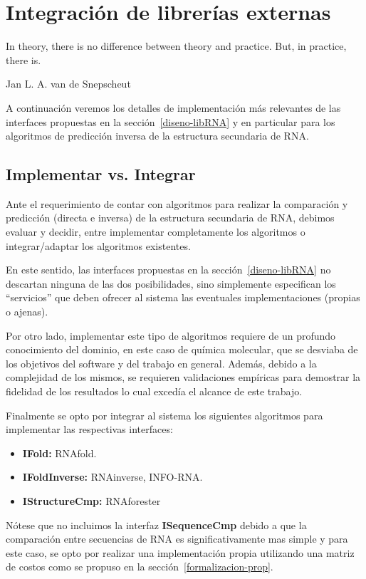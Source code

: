 \chapter{Integraci\'on de librer\'ias externas}
\label{librerias}
\epigraph{In theory, there is no difference between theory and practice. But, in
practice, there is.}%
{Jan L. A. van de Snepscheut}

A continuaci\'on veremos los detalles de implementaci\'on m\'as relevantes de
las interfaces propuestas en la secci\'on~\ref{diseno-libRNA} y en particular
para los algoritmos de predicci\'on inversa de la estructura secundaria de
\ac{RNA}.

\section{Implementar vs. Integrar}

Ante el requerimiento de contar con algoritmos para realizar la comparaci\'on y
predicci\'on (directa e inversa) de la estructura secundaria de \ac{RNA},
debimos evaluar y decidir, entre implementar completamente los algoritmos o
integrar/adaptar los algoritmos existentes.

En este sentido, las interfaces propuestas en la secci\'on~\ref{diseno-libRNA}
no descartan ninguna de las dos posibilidades, sino simplemente especifican los
``servicios'' que deben ofrecer al sistema las eventuales implementaciones
(propias o ajenas).

Por otro lado, implementar este tipo de algoritmos requiere de un profundo
conocimiento del dominio, en este caso de qu\'imica molecular, que se desviaba
de los objetivos del software y del trabajo en general. Adem\'as, debido a la
complejidad de los mismos, se requieren validaciones emp\'iricas para demostrar
la fidelidad de los resultados lo cual exced\'ia el alcance de este trabajo.

Finalmente se opto por integrar al sistema los siguientes algoritmos para
implementar las respectivas interfaces:
\begin{itemize}
 \item \textbf{IFold:} RNAfold\cite{Hofacker94}.
 \item \textbf{IFoldInverse:} RNAinverse\cite{Hofacker94},
INFO-RNA\cite{Busch07}.
 \item \textbf{IStructureCmp:} RNAforester\cite{Hochsmann05}
\end{itemize}

N\'otese que no incluimos la interfaz \textbf{ISequenceCmp} debido a que la
comparaci\'on entre secuencias de \ac{RNA} es significativamente mas simple y
para este caso, se opto por realizar una implementaci\'on propia utilizando una
matriz de costos como se propuso en la secci\'on~\ref{formalizacion-prop}.

